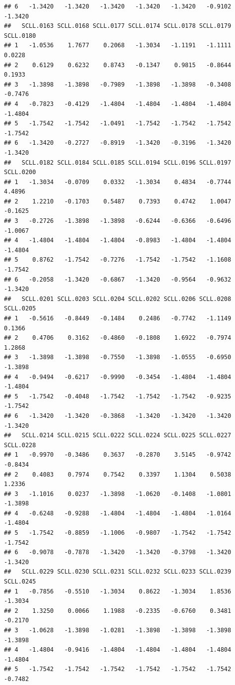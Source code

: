 \documentclass[
]{article}
\begin{document}
\begin{verbatim}
## 6   -1.3420   -1.3420   -1.3420   -1.3420   -1.3420   -0.9102   -1.3420
##   SCLL.0163 SCLL.0168 SCLL.0177 SCLL.0174 SCLL.0178 SCLL.0179 SCLL.0180
## 1   -1.0536    1.7677    0.2068   -1.3034   -1.1191   -1.1111    0.0228
## 2    0.6129    0.6232    0.8743   -0.1347    0.9815   -0.8644    0.1933
## 3   -1.3898   -1.3898   -0.7989   -1.3898   -1.3898   -0.3408   -0.7476
## 4   -0.7823   -0.4129   -1.4804   -1.4804   -1.4804   -1.4804   -1.4804
## 5   -1.7542   -1.7542   -1.0491   -1.7542   -1.7542   -1.7542   -1.7542
## 6   -1.3420   -0.2727   -0.8919   -1.3420   -0.3196   -1.3420   -1.3420
##   SCLL.0182 SCLL.0184 SCLL.0185 SCLL.0194 SCLL.0196 SCLL.0197 SCLL.0200
## 1   -1.3034   -0.0709    0.0332   -1.3034    0.4834   -0.7744    4.4896
## 2    1.2210   -0.1703    0.5487    0.7393    0.4742    1.0047   -0.1625
## 3   -0.2726   -1.3898   -1.3898   -0.6244   -0.6366   -0.6496   -1.0067
## 4   -1.4804   -1.4804   -1.4804   -0.8983   -1.4804   -1.4804   -1.4804
## 5    0.8762   -1.7542   -0.7276   -1.7542   -1.7542   -1.1608   -1.7542
## 6   -0.2058   -1.3420   -0.6867   -1.3420   -0.9564   -0.9632   -1.3420
##   SCLL.0201 SCLL.0203 SCLL.0204 SCLL.0202 SCLL.0206 SCLL.0208 SCLL.0205
## 1   -0.5616   -0.8449   -0.1484    0.2486   -0.7742   -1.1149    0.1366
## 2    0.4706    0.3162   -0.4860   -0.1808    1.6922   -0.7974    1.2868
## 3   -1.3898   -1.3898   -0.7550   -1.3898   -1.0555   -0.6950   -1.3898
## 4   -0.9494   -0.6217   -0.9990   -0.3454   -1.4804   -1.4804   -1.4804
## 5   -1.7542   -0.4048   -1.7542   -1.7542   -1.7542   -0.9235   -1.7542
## 6   -1.3420   -1.3420   -0.3868   -1.3420   -1.3420   -1.3420   -1.3420
##   SCLL.0214 SCLL.0215 SCLL.0222 SCLL.0224 SCLL.0225 SCLL.0227 SCLL.0228
## 1   -0.9970   -0.3486    0.3637   -0.2870    3.5145   -0.9742   -0.8434
## 2    0.4083    0.7974    0.7542    0.3397    1.1304    0.5038    1.2336
## 3   -1.1016    0.0237   -1.3898   -1.0620   -0.1408   -1.0801   -1.3898
## 4   -0.6248   -0.9288   -1.4804   -1.4804   -1.4804   -1.0164   -1.4804
## 5   -1.7542   -0.8859   -1.1006   -0.9807   -1.7542   -1.7542   -1.7542
## 6   -0.9078   -0.7878   -1.3420   -1.3420   -0.3798   -1.3420   -1.3420
##   SCLL.0229 SCLL.0230 SCLL.0231 SCLL.0232 SCLL.0233 SCLL.0239 SCLL.0245
## 1   -0.7856   -0.5510   -1.3034    0.8622   -1.3034    1.8536   -1.3034
## 2    1.3250    0.0066    1.1988   -0.2335   -0.6760    0.3481   -0.2170
## 3   -1.0628   -1.3898   -1.0281   -1.3898   -1.3898   -1.3898   -1.3898
## 4   -1.4804   -0.9416   -1.4804   -1.4804   -1.4804   -1.4804   -1.4804
## 5   -1.7542   -1.7542   -1.7542   -1.7542   -1.7542   -1.7542   -0.7482

\end{verbatim}
\end{document}
